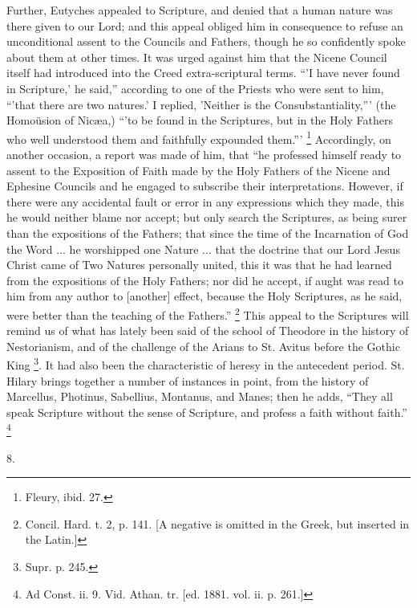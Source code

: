 Further, Eutyches appealed to Scripture, and denied that a human
nature was there given to our Lord; and this appeal obliged him in
consequence to refuse an unconditional assent to the Councils and
Fathers, though he so confidently spoke about them at other times. It
was urged against him that the Nicene Council itself had introduced
into the Creed extra-scriptural terms. ``'I have never found in
Scripture,' he said,'' according to one of the Priests who were
sent to him, ``'that there are two natures.' I replied, 'Neither
is the Consubstantiality,''' (the Homoüsion of Nicæa,) ``'to
be found in the Scriptures, but in the Holy Fathers who well
understood them and faithfully expounded them.''' \footnote{Fleury, ibid. 27.} Accordingly, on another occasion, a report was made of him,
that ``he professed himself ready to assent to the Exposition of
Faith made by the Holy Fathers of the Nicene and Ephesine Councils and
he engaged to subscribe their interpretations. However, if there were
any accidental fault or error in any expressions which they made, this
he would neither blame nor accept; but only search the Scriptures, as
being surer than the expositions of the Fathers; that since the time
of the Incarnation of God the Word ... he worshipped one Nature ...
that the doctrine that our Lord Jesus Christ came of Two Natures
personally united, this it was that he had learned from the
expositions of the Holy Fathers; nor did he accept, if aught was read
to him from any author to [another] effect, because the Holy
Scriptures, as he said, were better than the teaching of the
Fathers.'' \footnote{Concil. Hard. t. 2, p. 141. [A negative is
omitted in the Greek, but inserted in the Latin.]} This
appeal to the Scriptures will remind us of what has lately been said
of the school of Theodore in the history of Nestorianism, and of the
challenge of the Arians to St. Avitus before the Gothic King \footnote{Supr. p. 245.}. It had also been the characteristic of heresy in the
antecedent period. St. Hilary brings together a number of instances in
point, from the history of Marcellus, Photinus, Sabellius, Montanus,
and Manes; then he adds, ``They all speak Scripture without the
sense of Scripture, and profess a faith without faith.'' \footnote{Ad Const. ii. 9. Vid. Athan. tr. [ed.
1881. vol. ii. p. 261.]}

8.

